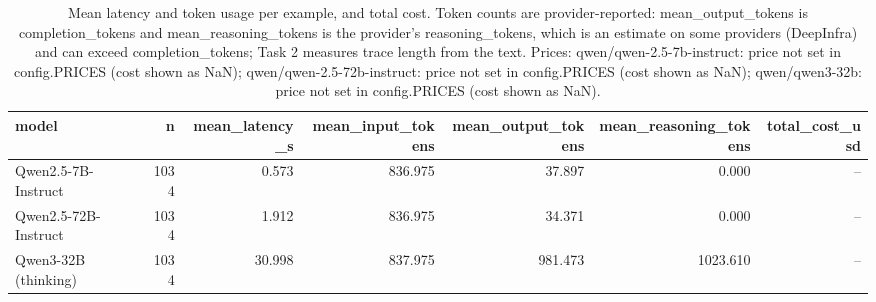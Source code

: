 \begin{table}[htbp]
\caption{Mean latency and token usage per example, and total cost. Token counts are provider-reported: mean\_output\_tokens is completion\_tokens and mean\_reasoning\_tokens is the provider's reasoning\_tokens, which is an estimate on some providers (DeepInfra) and can exceed completion\_tokens; Task 2 measures trace length from the text. Prices: qwen/qwen-2.5-7b-instruct: price not set in config.PRICES (cost shown as NaN); qwen/qwen-2.5-72b-instruct: price not set in config.PRICES (cost shown as NaN); qwen/qwen3-32b: price not set in config.PRICES (cost shown as NaN).}
\label{tab:task1_efficiency}
\begin{tabular}{lrrrrrr}
\toprule
model & n & mean\_latency\_s & mean\_input\_tokens & mean\_output\_tokens & mean\_reasoning\_tokens & total\_cost\_usd \\
\midrule
Qwen2.5-7B-Instruct & 1034 & 0.573 & 836.975 & 37.897 & 0.000 & -- \\
Qwen2.5-72B-Instruct & 1034 & 1.912 & 836.975 & 34.371 & 0.000 & -- \\
Qwen3-32B (thinking) & 1034 & 30.998 & 837.975 & 981.473 & 1023.610 & -- \\
\bottomrule
\end{tabular}
\end{table}
